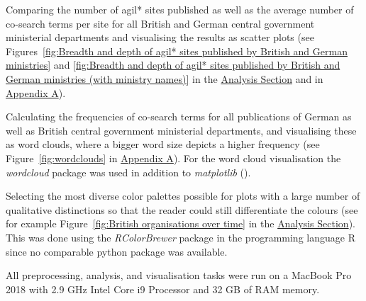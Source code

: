 \begin{compactitem}
\item Comparing the number of agil* sites published as well as the average number of co-search terms per site for all British and German central government ministerial departments and visualising the results as scatter plots (see Figures~\ref{fig:Breadth and depth of agil* sites published by British and German ministries} and \ref{fig:Breadth and depth of agil* sites published by British and German ministries (with ministry names)} in the \hyperref[Analysis]{Analysis Section} and in \hyperref[Appendix A]{Appendix A}). 
\item Calculating the frequencies of co-search terms for all publications of German as well as British central government ministerial departments, and visualising these as word clouds, where a bigger word size depicts a higher frequency (see Figure~\ref{fig:wordclouds} in \hyperref[Appendix A]{Appendix A}). For the word cloud visualisation the \textit{wordcloud} \parencite{Mueller2020} package was used in addition to \textit{matplotlib} (\cite{Hunter2007}).  
\item Selecting the most diverse color palettes possible for plots with a large number of qualitative distinctions so that the reader could still differentiate the colours (see for example Figure~\ref{fig:British organisations over time} in the \hyperref[Analysis]{Analysis Section}). This was done using the \textit{RColorBrewer} package \parencite{Neuwirth2020} in the programming language R since no comparable python package was available. 
\end{compactitem}
\noindent
All preprocessing, analysis, and visualisation tasks were run on a MacBook Pro 2018 with 2.9 GHz Intel Core i9 Processor and 32 GB of RAM memory. 

